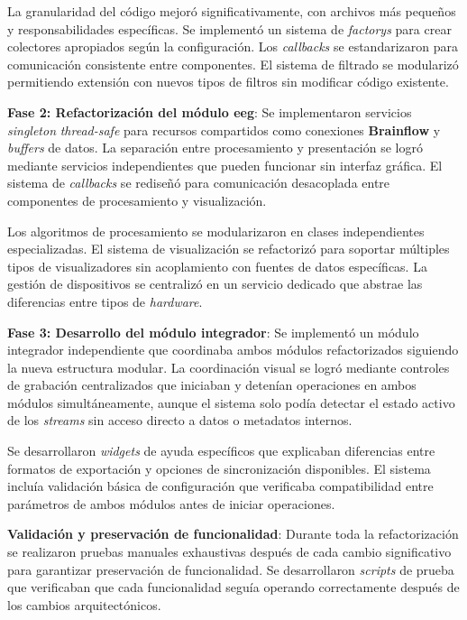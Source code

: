 La granularidad del código mejoró significativamente, con archivos más pequeños y responsabilidades específicas. Se implementó un sistema de \textit{\glspl{factory}} para crear colectores apropiados según la configuración. Los \textit{\glspl{callback}} se estandarizaron para comunicación consistente entre componentes. El sistema de filtrado se modularizó permitiendo extensión con nuevos tipos de filtros sin modificar código existente.

\textbf{Fase 2: Refactorización del módulo \acrshort{eeg}}:
Se implementaron servicios \textit{singleton} \textit{\gls{thread-safe}} para recursos compartidos como conexiones \textbf{Brainflow} y \textit{\glspl{buffer}} de datos. La separación entre procesamiento y presentación se logró mediante servicios independientes que pueden funcionar sin interfaz gráfica. El sistema de \textit{\glspl{callback}} se rediseñó para comunicación desacoplada entre componentes de procesamiento y visualización.

Los algoritmos de procesamiento se modularizaron en clases independientes especializadas. El sistema de visualización se refactorizó para soportar múltiples tipos de visualizadores sin acoplamiento con fuentes de datos específicas. La gestión de dispositivos se centralizó en un servicio dedicado que abstrae las diferencias entre tipos de \textit{hardware}.

\textbf{Fase 3: Desarrollo del módulo integrador}:
Se implementó un módulo integrador independiente que coordinaba ambos módulos refactorizados siguiendo la nueva estructura modular. La coordinación visual se logró mediante controles de grabación centralizados que iniciaban y detenían operaciones en ambos módulos simultáneamente, aunque el sistema solo podía detectar el estado activo de los \textit{\glspl{stream}} sin acceso directo a datos o metadatos internos.

Se desarrollaron \textit{\glspl{widget}} de ayuda específicos que explicaban diferencias entre formatos de exportación y opciones de sincronización disponibles. El sistema incluía validación básica de configuración que verificaba compatibilidad entre parámetros de ambos módulos antes de iniciar operaciones.

\textbf{Validación y preservación de funcionalidad}:
Durante toda la refactorización se realizaron pruebas manuales exhaustivas después de cada cambio significativo para garantizar preservación de funcionalidad. Se desarrollaron \textit{scripts} de prueba que verificaban que cada funcionalidad seguía operando correctamente después de los cambios arquitectónicos.

